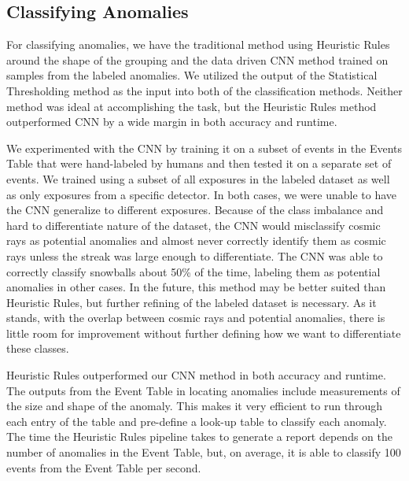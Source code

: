 \subsection{Classifying Anomalies}
For classifying anomalies, we have the traditional method using Heuristic Rules around the shape of the grouping and the data driven CNN method trained on samples from the labeled anomalies. 
We utilized the output of the Statistical Thresholding method as the input into both of the classification methods. 
Neither method was ideal at accomplishing the task, but the Heuristic Rules method outperformed CNN by a wide margin in both accuracy and runtime.

We experimented with the CNN by training it on a subset of events in the Events Table that were hand-labeled by humans and then tested it on a separate set of events. 
We trained using a subset of all exposures in the labeled dataset as well as only exposures from a specific detector.
In both cases, we were unable to have the CNN generalize to different exposures. 
Because of the class imbalance and hard to differentiate nature of the dataset, the CNN would misclassify cosmic rays as potential anomalies and almost never correctly identify them as cosmic rays unless the streak was large enough to differentiate. 
The CNN was able to correctly classify snowballs about 50\% of the time, labeling them as potential anomalies in other cases. 
In the future, this method may be better suited than Heuristic Rules, but further refining of the labeled dataset is necessary.
As it stands, with the overlap between cosmic rays and potential anomalies, there is little room for improvement without further defining how we want to differentiate these classes.

Heuristic Rules outperformed our CNN method in both accuracy and runtime.
The outputs from the Event Table in locating anomalies include measurements of the size and shape of the anomaly. 
This makes it very efficient to run through each entry of the table and pre-define a look-up table to classify each anomaly. 
The time the Heuristic Rules pipeline takes to generate a report depends on the number of anomalies in the Event Table, but, on average, it is able to classify 100 events from the Event Table per second. 

